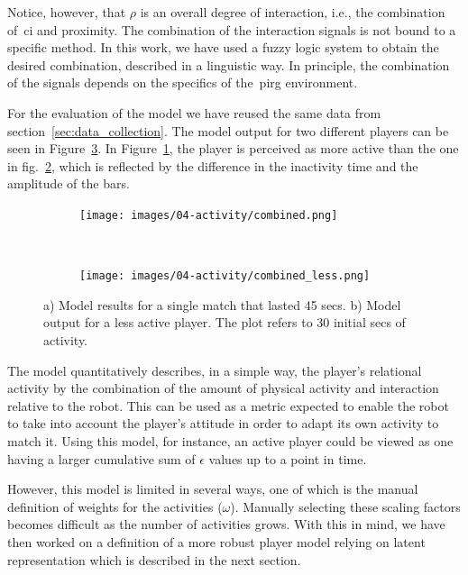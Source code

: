Notice, however, that $\rho$ is an overall degree of interaction, i.e., the combination of~\gls{ci} and proximity. The combination of the interaction signals is not bound to a specific method. In this work, we have used a fuzzy logic system to obtain the desired combination, described in a linguistic way. In principle, the combination of the signals depends on the specifics of the~\gls{pirg} environment.

For the evaluation of the model we have reused the same data from section~\ref{sec:data_collection}. The model output for two different players can be seen in Figure~\ref{fig:model_output}. In Figure~\ref{fig:fun}, the player is perceived as more active than the one in fig.~\ref{fig:nofun}, which is reflected by the difference in the inactivity time and the amplitude of the bars.

\begin{figure}[h]
    \centering 
	\begin{subfigure}[h]{5cm}
		\centering      
		\texttt{[image: images/04-activity/combined.png]}
		\caption{}
		\label{fig:fun}
	\end{subfigure}
	~
	\begin{subfigure}[h]{5cm}
		\centering      
      	\texttt{[image: images/04-activity/combined\_less.png]}
      	\caption{}
      	\label{fig:nofun}
     \end{subfigure}
      \caption{a) Model results for a single match that lasted 45 secs. b) Model output for a less active player. The plot refers to 30 initial secs of activity.}		
      \label{fig:model_output}
\end{figure}

The model quantitatively describes, in a simple way, the player's relational activity by the combination of the amount of physical activity and interaction relative to the robot. This can be used as a metric expected to enable the robot to take into account the player's attitude in order to adapt its own activity to match it. Using this model, for instance, an active player could be viewed as one having a larger cumulative sum of $\epsilon$ values up to a point in time.

However, this model is limited in several ways, %
one of which is the manual definition of weights for the activities ($\omega$). Manually selecting these scaling factors becomes difficult as the number of activities grows. With this in mind, we have then worked on a definition of a more robust player model relying on latent representation which is described in the next section.


